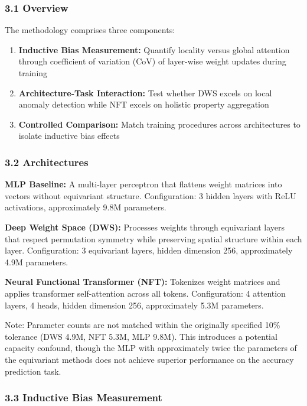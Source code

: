 
\subsubsection{3.1 Overview}

The methodology comprises three components:

\begin{enumerate}
\item \textbf{Inductive Bias Measurement:} Quantify locality versus global attention through coefficient of variation (CoV) of layer-wise weight updates during training
\item \textbf{Architecture-Task Interaction:} Test whether DWS excels on local anomaly detection while NFT excels on holistic property aggregation
\item \textbf{Controlled Comparison:} Match training procedures across architectures to isolate inductive bias effects
\end{enumerate}

\subsubsection{3.2 Architectures}

\textbf{MLP Baseline:} A multi-layer perceptron that flattens weight matrices into vectors without equivariant structure. Configuration: 3 hidden layers with ReLU activations, approximately 9.8M parameters.

\textbf{Deep Weight Space (DWS):} Processes weights through equivariant layers that respect permutation symmetry while preserving spatial structure within each layer. Configuration: 3 equivariant layers, hidden dimension 256, approximately 4.9M parameters.

\textbf{Neural Functional Transformer (NFT):} Tokenizes weight matrices and applies transformer self-attention across all tokens. Configuration: 4 attention layers, 4 heads, hidden dimension 256, approximately 5.3M parameters.

Note: Parameter counts are not matched within the originally specified 10\% tolerance (DWS 4.9M, NFT 5.3M, MLP 9.8M). This introduces a potential capacity confound, though the MLP with approximately twice the parameters of the equivariant methods does not achieve superior performance on the accuracy prediction task.

\subsubsection{3.3 Inductive Bias Measurement}

